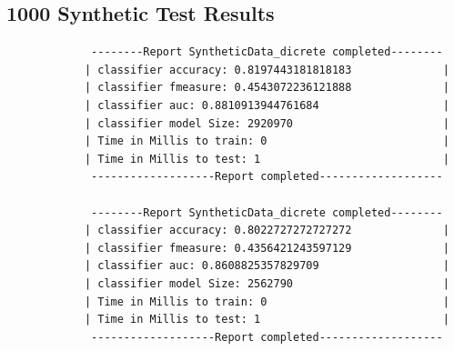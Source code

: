 \documentclass[a4paper,11pt]{scrreprt}
\begin{document}
\subsection{1000 Synthetic Test Results}
\begin{verbatim}
			 --------Report SyntheticData_dicrete completed--------
			| classifier accuracy: 0.8197443181818183              |
			| classifier fmeasure: 0.4543072236121888              |
			| classifier auc: 0.8810913944761684                   |
			| classifier model Size: 2920970                       |
			| Time in Millis to train: 0                           |
			| Time in Millis to test: 1                            |
			 -------------------Report completed-------------------
			
			 --------Report SyntheticData_dicrete completed--------
			| classifier accuracy: 0.8022727272727272              |
			| classifier fmeasure: 0.4356421243597129              |
			| classifier auc: 0.8608825357829709                   |
			| classifier model Size: 2562790                       |
			| Time in Millis to train: 0                           |
			| Time in Millis to test: 1                            |
			 -------------------Report completed-------------------
\end{verbatim}			
\end{document}
